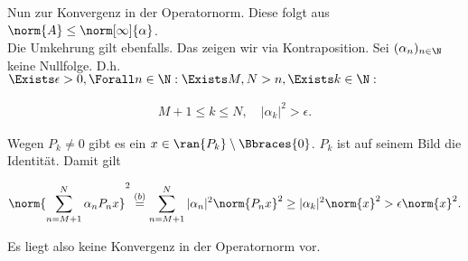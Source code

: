 \begin{solution}
Nun zur Konvergenz in der Operatornorm.
Diese folgt aus $\norm{A} \leq \norm[\infty]{\alpha}$. \\

Die Umkehrung gilt ebenfalls.
Das zeigen wir via Kontraposition.
Sei $(\alpha_n)_{n \in \N}$ keine Nullfolge.
D.h. $\Exists \epsilon > 0, \Forall n \in \N: \Exists M, N > n, \Exists k \in \N:$

\begin{align*}
  M+1 \leq k \leq N,
  \quad
  |\alpha_k|^2 > \epsilon.
\end{align*}

Wegen $P_k \neq 0$ gibt es ein $x \in \ran{P_k} \setminus \Bbraces{0}$.
$P_k$ ist auf seinem Bild die Identität.
Damit gilt

\begin{align*}
 \norm{\sum_{n = M+1}^N \alpha_n P_n x}^2
 \stackrel{(b)}{=}
 \sum_{n = M+1}^N |\alpha_n|^2 \norm{P_n x}^2
 \geq
 |\alpha_k|^2 \norm{x}^2
 >
 \epsilon \norm{x}^2.
\end{align*}

Es liegt also keine Konvergenz in der Operatornorm vor. \\

\end{solution}
